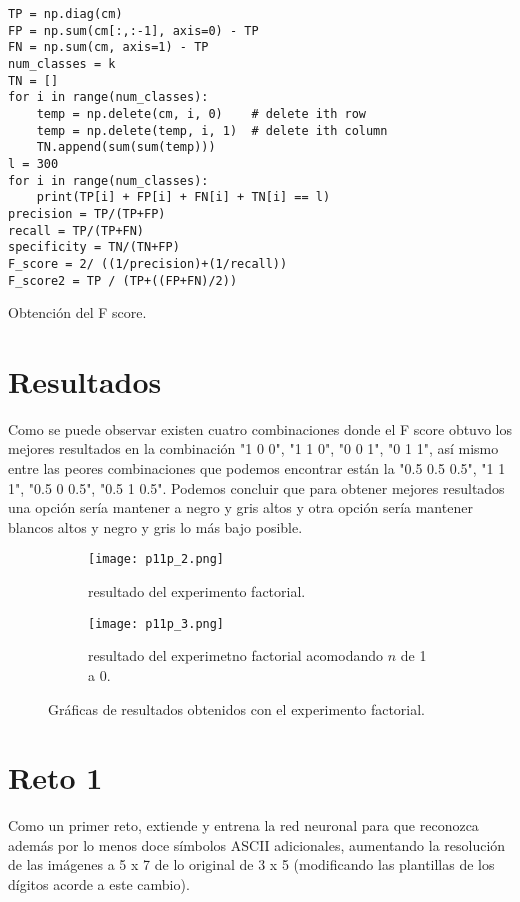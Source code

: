 \documentclass{article}
\begin{document}
\renewcommand{\listingscaption}{Código}
\begin{listing}[H]
  \begin{verbatim}
TP = np.diag(cm)
FP = np.sum(cm[:,:-1], axis=0) - TP
FN = np.sum(cm, axis=1) - TP
num_classes = k
TN = []
for i in range(num_classes):
    temp = np.delete(cm, i, 0)    # delete ith row
    temp = np.delete(temp, i, 1)  # delete ith column
    TN.append(sum(sum(temp)))
l = 300
for i in range(num_classes):
    print(TP[i] + FP[i] + FN[i] + TN[i] == l)
precision = TP/(TP+FP)
recall = TP/(TP+FN)    
specificity = TN/(TN+FP)
F_score = 2/ ((1/precision)+(1/recall))
F_score2 = TP / (TP+((FP+FN)/2))    
      \end{verbatim}
  \label{lst:fibo}
  \caption{Obtención del F score.}
\end{listing}

\section{Resultados}
Como se puede observar existen cuatro combinaciones donde el F score obtuvo los mejores resultados en la combinación "1 0 0", "1 1 0", "0 0 1", "0 1 1", así mismo entre las peores combinaciones que podemos encontrar están la "0.5 0.5 0.5", "1 1 1", "0.5 0 0.5", "0.5 1 0.5". Podemos concluir que para obtener mejores resultados una opción sería mantener a negro y gris altos y otra opción sería mantener blancos altos y negro y gris lo más bajo posible. 

\begin{figure}[H]
\centering
\begin{subfigure}[b]{0.40\linewidth}
\texttt{[image: p11p\_2.png]}
\caption{resultado del experimento factorial.}
\end{subfigure}
\begin{subfigure}[b]{0.40\linewidth}
\texttt{[image: p11p\_3.png]}
\caption{resultado del experimetno factorial acomodando $n$ de 1 a 0.}
\end{subfigure}
\caption{Gráficas de resultados obtenidos con el experimento factorial.}
\label{fig:westminster}
\end{figure}

\section{Reto 1}
Como un primer reto, extiende y entrena la red neuronal para que reconozca además por lo menos doce símbolos ASCII adicionales, aumentando la resolución de las imágenes a 5 x 7 de lo original de 3 x 5  (modificando las plantillas de los dígitos acorde a este cambio).
\end{document}
